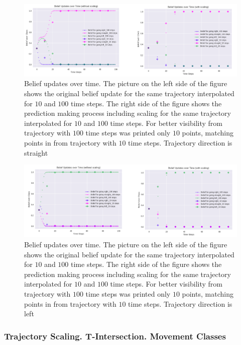 \begin{figure}[H]
	\centering  	
	\includegraphics[width=13cm]{img/ScalingStraightX.png}
	\caption{Belief updates over time. The picture on the left side of the figure shows the original belief update for the same trajectory interpolated for $10$ and $100$ time steps. The right side of the figure shows the prediction making process including scaling for the same trajectory interpolated for $10$ and $100$ time steps. For better visibility from trajectory with $100$ time steps was printed only $10$ points, matching points in from trajectory with  $10$ time steps. Trajectory direction is straight}
	\label{fig:ScallingStraightX}    
\end{figure}

\begin{figure}[H]
	\centering  	
	\includegraphics[width=13cm]{img/ScalingLeftX.png}
	\caption{Belief updates over time. The picture on the left side of the figure shows the original belief update for the same trajectory interpolated for $10$ and $100$ time steps. The right side of the figure shows the prediction making process including scaling for the same trajectory interpolated for $10$ and $100$ time steps. For better visibility from trajectory with $100$ time steps was printed only $10$ points, matching points in from trajectory with  $10$ time steps. Trajectory direction is left}
	\label{fig:ScallingLeftX}    
\end{figure}

\subsubsection{Trajectory Scaling. T-Intersection. Movement Classes}

